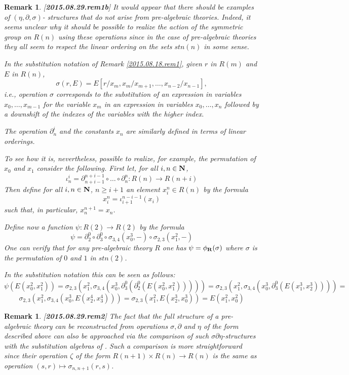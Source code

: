 \documentclass[11pt]{article}
\newtheorem{remark}[proposition]{Remark}
\newcommand{\llabel}[1]{\label{#1}[{\bf #1}]}
\newcommand{\sr}{\rightarrow}
\newcommand{\nn}{{\bf N\rm}}
\newcommand{\nat}{\nn}
\newcommand{\rr}{{\bf R}}
\begin{document}
%
\begin{remark}\rm
\llabel{2015.08.29.rem1b}
It would appear that there should be examples of $(\eta,\partial,\sigma)$- structures that do not arise from pre-algebraic theories. Indeed, it seems unclear why it should be possible to realize the action of the symmetric group on $R(n)$ using these operations since  in the case of pre-algebraic theories  they all seem to respect the linear ordering on the sets $stn(n)$ in some sense. 

In the substitution notation of Remark \ref{2015.08.18.rem1}, given $r$ in $R(m)$ and $E$ in $R(n)$, 
%
$$\sigma(r,E)=E[r/x_m,x_m/x_{m+1},\dots,x_{n-2}/x_{n-1}],$$
%
i.e., operation $\sigma$ corresponds to the substitution of an expression in variables $x_0,\dots,x_{m-1}$ for the variable $x_m$ in an expression in variables $x_0,\dots,x_n$ followed by a downshift of the indexes of the variables with the higher index. 

The operation $\partial_n^i$ and the constants $x_{n}$ are similarly defined in terms of linear orderings.

To see how it is, nevertheless, possible to realize, for example, the permutation of $x_0$ and $x_1$ consider the following. First let, for all $i,n\in\nat$, 
%
$$\iota_n^i=\partial_{n+i-1}^{n+i-1}\circ \dots\circ \partial_n^n:R(n)\sr R(n+i)$$
%
Then define for all $i,n\in\nat$, $n\ge i+1$ an element $x^n_i\in R(n)$ by the formula
%
$$x^n_i=\iota_{i+1}^{n-i-1}(x_i)$$
%
such that, in particular, $x^{n+1}_{n}=x_n$.

Define now a function $\psi:R(2)\sr R(2)$ by the formula
%
$$\psi=\partial^0_2\circ \partial^0_3\circ \sigma_{3,4}(x_0^3,-)\circ \sigma_{2,3}(x_1^2,-)$$
%
One can verify that for any pre-algebraic theory $R$ one has $\psi=\phi_{\rr}(\sigma)$ where $\sigma$ is the permutation of $0$ and $1$ in $stn(2)$.

In the substitution notation this can be seen as follows:
%
$$\psi(E(x^2_0,x_1^2))=\sigma_{2,3}(x_1^2,\sigma_{3,4}(x_0^3,\partial^0_3(\partial^0_2(E(x^2_0,x_1^2)))))=\sigma_{2,3}(x_1^2,\sigma_{3,4}(x_0^3,\partial^0_3(E(x^3_1,x^3_2))))=$$
$$\sigma_{2,3}(x_1^2,\sigma_{3,4}(x_0^3,E(x^4_2,x^4_3)))=\sigma_{2,3}(x_1^2,E(x^3_2,x^3_0))=E(x^2_1,x^2_0)$$
%
\end{remark}
%
\begin{remark}\rm
\llabel{2015.08.29.rem2}
The fact that the full structure of a pre-algebraic theory can be reconstructed from operations $\sigma,\partial$ and $\eta$ of the form described above can also be approached via the comparison of such $\sigma\partial\eta$-structures with the substitution algebras of \cite[Definition 3.1]{FPT}. Such a comparison is more straightforward since their operation $\zeta$ of the form $R(n+1)\times R(n)\sr R(n)$ is the same as operation $(s,r)\mapsto \sigma_{n,n+1}(r,s)$.
\end{remark}
\end{document}
